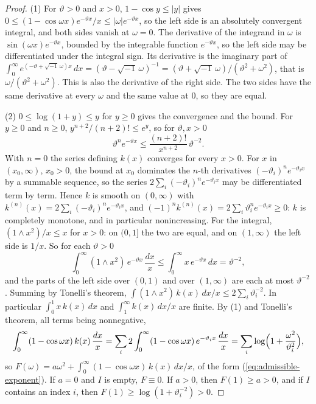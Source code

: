 \begin{proof}
(1) For $\vartheta > 0$ and $x > 0$, $1 - \cos y \le |y|$ gives
$0 \le (1 - \cos\omega x)e^{-\vartheta x}/x \le |\omega|e^{-\vartheta x}$, so the left side is an
absolutely convergent integral, and both sides vanish at $\omega = 0$. The derivative of the
integrand in $\omega$ is $\sin(\omega x)e^{-\vartheta x}$, bounded by the integrable function
$e^{-\vartheta x}$, so the left side may be differentiated under the integral sign. Its derivative
is the imaginary part of
$\int_0^\infty e^{(-\vartheta + \sqrt{-1}\,\omega)x}\,dx = (\vartheta - \sqrt{-1}\,\omega)^{-1}
= (\vartheta + \sqrt{-1}\,\omega)/(\vartheta^2 + \omega^2)$, that is $\omega/(\vartheta^2 + \omega^2)$.
This is also the derivative of the right side. The two sides have the same derivative at every
$\omega$ and the same value at $0$, so they are equal.

(2) $0 \le \log(1 + y) \le y$ for $y \ge 0$ gives the convergence and the bound. For $y \ge 0$ and
$n \ge 0$, $y^{n+2}/(n+2)! \le e^y$, so for $\vartheta, x > 0$
\[
  \vartheta^ne^{-\vartheta x} \le \frac{(n+2)!}{x^{n+2}}\,\vartheta^{-2} .
\]
With $n = 0$ the series defining $k(x)$ converges for every $x > 0$. For $x$ in $(x_0, \infty)$,
$x_0 > 0$, the bound at $x_0$ dominates the $n$-th derivatives $(-\vartheta_i)^ne^{-\vartheta_ix}$
by a summable sequence, so the series $2\sum_i(-\vartheta_i)^ne^{-\vartheta_ix}$ may be
differentiated term by term. Hence $k$ is smooth on $(0, \infty)$ with
$k^{(n)}(x) = 2\sum_i(-\vartheta_i)^ne^{-\vartheta_ix}$, and $(-1)^nk^{(n)}(x) =
2\sum_i\vartheta_i^ne^{-\vartheta_ix} \ge 0$: $k$ is completely monotone, and in particular
nonincreasing. For the integral, $(1 \wedge x^2)/x \le x$ for $x > 0$: on $(0, 1]$ the two are
equal, and on $(1, \infty)$ the left side is $1/x$. So for each $\vartheta > 0$
\[
  \int_0^\infty(1 \wedge x^2)\,e^{-\vartheta x}\,\frac{dx}{x}
  \le \int_0^\infty x\,e^{-\vartheta x}\,dx = \vartheta^{-2},
\]
and the parts of the left side over $(0, 1)$ and over $(1, \infty)$ are each at most
$\vartheta^{-2}$. Summing by Tonelli's theorem,
$\int(1 \wedge x^2)\,k(x)\,dx/x \le 2\sum_i\vartheta_i^{-2}$. In particular
$\int_0^1x\,k(x)\,dx$ and $\int_1^\infty k(x)\,dx/x$ are finite. By (1) and Tonelli's theorem, all
terms being nonnegative,
\[
  \int_0^\infty(1 - \cos\omega x)\,k(x)\,\frac{dx}{x}
  = \sum_i2\int_0^\infty(1 - \cos\omega x)\,e^{-\vartheta_ix}\,\frac{dx}{x}
  = \sum_i\log\Bigl(1 + \frac{\omega^2}{\vartheta_i^2}\Bigr),
\]
so $F(\omega) = a\omega^2 + \int_0^\infty(1 - \cos\omega x)\,k(x)\,dx/x$, of the form
(\ref{eq:admissible-exponent}). If $a = 0$ and $I$ is empty, $F \equiv 0$. If $a > 0$, then
$F(1) \ge a > 0$, and if $I$ contains an index $i$, then $F(1) \ge \log(1 + \vartheta_i^{-2}) > 0$.
\end{proof}


